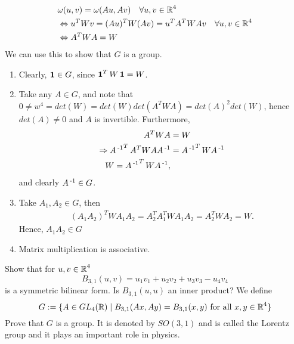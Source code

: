 \documentclass[11pt,onecolumn]{article}
\begin{document}
\begin{answer}
\begin{align*}
    &\omega(u,v) = \omega(Au,Av) \quad \forall u,v \in \operatorname{\mathbb{R}}^4 \\
    &\Leftrightarrow u^TWv = (Au)^TW(Av) = u^TA^TWAv \quad \forall u,v \in \operatorname{\mathbb{R}}^4 \\
    &\Leftrightarrow A^TWA = W
\end{align*}
We can use this to show that $G$ is a group.
\begin{enumerate}
    \item Clearly, $\operatorname{\mathbf{1}} \in G$, since $\operatorname{\mathbf{1}}^T W \operatorname{\mathbf{1}} = W$.
    \item Take any $A \in G$, and note that $0 \neq w^4 = det(W) = det(W)det(A^TWA) = det(A)^2 det(W) $, hence $det(A) \neq 0$ and $A$ is invertible. Furthermore, 
    \begin{align*}
        A^TWA &= W \\
        \Rightarrow A\operatorname{^{-1}}^T A^T W A A\operatorname{^{-1}} &= A\operatorname{^{-1}}^T W A\operatorname{^{-1}} \\
        W = A\operatorname{^{-1}}^T W A\operatorname{^{-1}},
    \end{align*}
    and clearly $A\operatorname{^{-1}} \in G$.
    \item Take $A_1,A_2 \in G$, then
    \begin{align*} 
        (A_1A_2)^T W A_1A_2 = A_2^TA_1^TW A_1A_2 = A_2^T W A_2 = W.
    \end{align*}
    Hence, $A_1A_2 \in G$
    \item Matrix multiplication is associative.
\end{enumerate}
\end{answer}
\begin{exercise}
Show that for $u, v \in \operatorname{\mathbb{R}}^4$
$$B_{3,1}(u, v) = u_1v_1 + u_2v_2 + u_3v_3 - u_4v_4$$
is a symmetric bilinear form. Is $B_{3,1}(u,u)$ an inner product? We define
$$G := \{A \in GL_4(\operatorname{\mathbb{R}}) \mid B_{3,1}(Ax, Ay) = B_{3,1}(x, y)\text{ for all }x, y \in \operatorname{\mathbb{R}}^4\}$$
Prove that $G$ is a group. It is denoted by $SO(3,1)$ and is called the Lorentz group and it plays an important role in physics.
\end{exercise}
\end{document}
